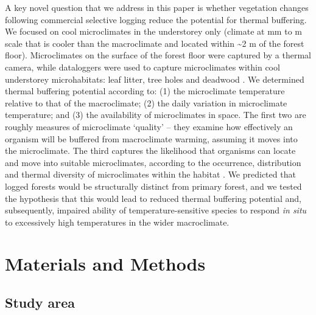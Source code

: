 \documentclass[12pt,a4paper,]{report}
\theoremstyle{definition}
\theoremstyle{definition}
\theoremstyle{definition}
\theoremstyle{remark}
\begin{document}
A key novel question that we address in this paper is whether vegetation
changes following commercial selective logging reduce the potential for
thermal buffering. We focused on cool microclimates in the understorey
only (climate at mm to m scale that is cooler than the macroclimate and
located within \textasciitilde{}2 m of the forest floor). Microclimates
on the surface of the forest floor were captured by a thermal camera,
while dataloggers were used to capture microclimates within cool
understorey microhabitats: leaf litter, tree holes and deadwood
\citep{scheffers_microhabitats2014-1, scheffers_microhabitats2014, gonzalez_del_pliego_thermally2016}.
We determined thermal buffering potential according to: (1) the
microclimate temperature relative to that of the macroclimate; (2) the
daily variation in microclimate temperature; and (3) the availability of
microclimates in space. The first two are roughly measures of
microclimate `quality' -- they examine how effectively an organism will
be buffered from macroclimate warming, assuming it moves into the
microclimate. The third captures the likelihood that organisms can
locate and move into suitable microclimates, according to the
occurrence, distribution and thermal diversity of microclimates within
the habitat \citep{sears_world2011, caillon_warming2014}. We predicted
that logged forests would be structurally distinct from primary forest,
and we tested the hypothesis that this would lead to reduced thermal
buffering potential and, subsequently, impaired ability of
temperature-sensitive species to respond \emph{in situ} to excessively
high temperatures in the wider macroclimate.

\section{Materials and Methods}\label{materials-and-methods}

\subsection{Study area}\label{study-area}
\end{document}
